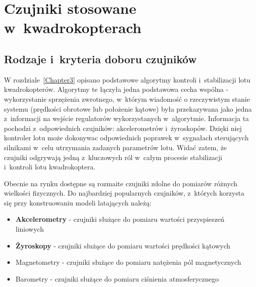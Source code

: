 \documentclass[11pt, twoside]{Thesis} %
\begin{document}
% 

\chapter{Czujniki stosowane w~kwadrokopterach} %

\label{Chapter4} %


\section{Rodzaje i~kryteria doboru czujników}

W rozdziale~\ref{Chapter3} opisano podstawowe algorytmy kontroli i~stabilizacji lotu kwadrokopterów. Algorytmy te łączyła jedna podstawowa cecha wspólna - wykorzystanie sprzężenia zwrotnego, w~którym wiadomość o rzeczywistym stanie systemu (prędkości obrotowe lub położenie kątowe) była przekazywana jako jedna z~informacji na wejście regulatorów wykorzystanych w~algorytmie. Informacja ta pochodzi z~odpowiednich czujników: akcelerometrów i~żyroskopów. Dzięki niej kontroler lotu może dokonywac odpowiednich poprawek w~sygnałach sterujących silnikami w~celu utrzymania zadanych parametrów lotu. Widać zatem, że czujniki odgrywają jedną z~kluczowych ról w~całym procesie stabilizacji i~kontroli lotu kwadrokoptera. 

Obecnie na rynku dostępne są rozmaite czujniki zdolne do pomiarów różnych wielkości fizycznych. Do najbardziej popularnych czujników, z~których korzysta się przy konstruowaniu modeli latających należą:

\begin{itemize}
	\item \textbf{Akcelerometry} - czujniki służące do pomiaru wartości przyspieszeń liniowych
	\item \textbf{Żyroskopy} - czujniki służące do pomiaru wartości prędkości kątowych
	\item Magnetometry - czujniki służące do pomiaru natężenia pól magnetycznych
	\item Barometry - czujniki służące do pomiaru ciśnienia atmosferycznego
\end{itemize}
\end{document}

